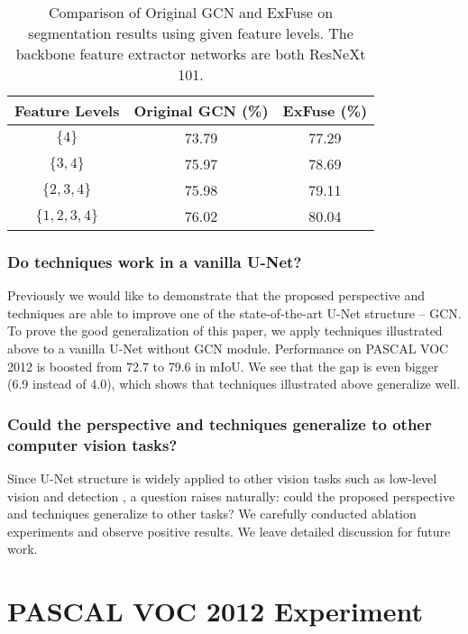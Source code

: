 \documentclass[runningheads]{llncs}
\begin{document}
\begin{table}
\begin{center}
\begin{tabular}{c|c|c}
\hline
Feature Levels & Original GCN \cite{Peng2017Large} (\%)& ExFuse (\%) \\
\hline
$\{4\}$ & 73.79& 77.29 \\
\hline
$\{3,4\}$ & 75.97& 78.69 \\
\hline
$\{2,3,4\}$ & 75.98& 79.11\\
\hline
$\{1,2,3,4\}$ & 76.02& 80.04\\
\hline
\end{tabular}
\end{center}

\caption{Comparison of Original GCN \cite{Peng2017Large} and ExFuse on segmentation results using given feature levels. The backbone feature extractor networks are both ResNeXt 101.}

\label{tbl:compfusion}
\end{table}

\subsubsection{Do techniques work in a vanilla U-Net?}
Previously we would like to demonstrate that the proposed perspective and techniques are able to improve one of the state-of-the-art U-Net structure -- GCN. To prove the good generalization of this paper, we apply techniques illustrated above to a vanilla U-Net without GCN module. Performance on PASCAL VOC 2012 is boosted from 72.7 to 79.6 in mIoU. We see that the gap is even bigger (6.9 instead of 4.0), which shows that techniques illustrated above generalize well.

\subsubsection{Could the perspective and techniques generalize to other computer vision tasks?}
Since U-Net structure is widely applied to other vision tasks such as low-level vision \cite{Shen2017Convolutional} and detection \cite{Lin2016Feature}, a question raises naturally: could the proposed perspective and techniques generalize to other tasks? We carefully conducted ablation experiments and observe positive results. We leave detailed discussion for future work.


\section{PASCAL VOC 2012 Experiment}
\end{document}
